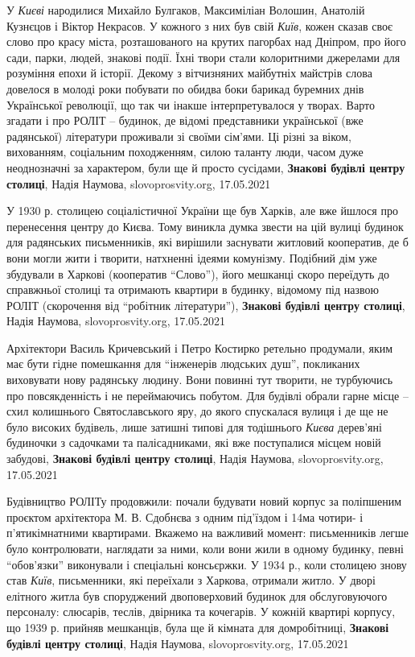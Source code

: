 У \emph{Києві} народилися Михайло Булгаков, Максиміліан Волошин, Анатолій Кузнєцов і
Віктор Некрасов. У кожного з них був свій \emph{Київ}, кожен сказав своє слово про
красу міста, розташованого на крутих пагорбах над Дніпром, про його сади,
парки, людей, знакові події. Їхні твори стали колоритними джерелами для
розуміння епохи й історії. Декому з вітчизняних майбутніх майстрів слова
довелося в молоді роки побувати по обидва боки барикад буремних днів
Української революції, що так чи інакше інтерпретувалося у творах.  Варто
згадати і про РОЛІТ – будинок, де відомі представники української (вже
радянської) літератури проживали зі своїми сім’ями. Ці різні за віком,
вихованням, соціальним походженням, силою таланту люди, часом дуже неоднозначні
за характером, були ще й просто сусідами,
\textbf{Знакові будівлі центру столиці}, Надія Наумова, slovoprosvity.org, 17.05.2021

У 1930 р. столицею соціалістичної України ще був Харків, але вже йшлося про
перенесення центру до Києва. Тому виникла думка звести на цій вулиці будинок
для радянських письменників, які вирішили заснувати житловий кооператив, де б
вони могли жити і творити, натхненні ідеями комунізму. Подібний дім уже
збудували в Харкові (кооператив \enquote{Слово}), його мешканці скоро переїдуть до
справжньої столиці та отримають квартири в будинку, відомому під назвою РОЛІТ
(скорочення від \enquote{робітник літератури}),
\textbf{Знакові будівлі центру столиці}, Надія Наумова, slovoprosvity.org, 17.05.2021

Архітектори Василь Кричевський і Петро Костирко ретельно продумали, яким має
бути гідне помешкання для \enquote{інженерів людських душ}, покликаних виховувати нову
радянську людину. Вони повинні тут творити, не турбуючись про повсякденність і
не переймаючись побутом. Для будівлі обрали гарне місце – схил колишнього
Святославського яру, до якого спускалася вулиця і де ще не було високих
будівель, лише затишні типові для тодішнього \emph{Києва} дерев’яні будиночки з
садочками та палісадниками, які вже поступалися місцем новій забудові,
\textbf{Знакові будівлі центру столиці}, Надія Наумова, slovoprosvity.org, 17.05.2021

Будівництво РОЛІТу продовжили: почали будувати новий корпус за поліпшеним
проєктом архітектора М. В. Сдобнєва з одним під’їздом і 14ма чотири- і
п’ятикімнатними квартирами.  Вкажемо на важливий момент: письменників легше
було контролювати, наглядати за ними, коли вони жили в одному будинку, певні
\enquote{обов’язки} виконували і спеціальні консьєржки.  У 1934 р., коли
столицею знову став \emph{Київ}, письменники, які переїхали з Харкова, отримали
житло. У дворі елітного житла був споруджений двоповерховий будинок для
обслуговуючого персоналу: слюсарів, теслів, двірника та кочегарів. У кожній
квартирі корпусу, що 1939 р. прийняв мешканців, була ще й кімната для
домробітниці,
\textbf{Знакові будівлі центру столиці}, Надія Наумова, slovoprosvity.org, 17.05.2021


